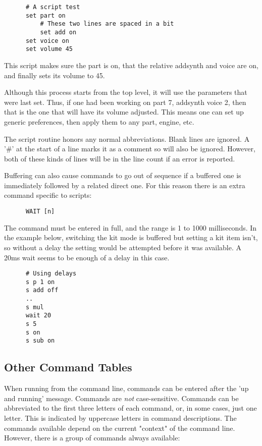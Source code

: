    \begin{verbatim}
      # A script test
      set part on
          # These two lines are spaced in a bit
          set add on
      set voice on
      set volume 45
   \end{verbatim}

   This script makes sure the part is on, that the relative addsynth and voice
   are on, and finally sets its volume to 45.

   Although this process starts from the top level, it will use the parameters
   that were last set.
   Thus, if one had been working on part 7, addsynth voice 2,
   then that is the one that will have its volume adjusted.
   This means one can set up generic preferences,
   then apply them to any part, engine, etc.

   The script routine honors any normal abbreviations.
   Blank lines are ignored. A '\#' at the start of a line marks it
   as a comment so will also be ignored. However, both of these kinds
   of lines will be in the line count if an error is reported.

   Buffering can also cause commands to go out of sequence if a buffered one is
   immediately followed by a related direct one. For this reason there is an
   extra command specific to scripts:

   \begin{verbatim}
      WAIT [n]
   \end{verbatim}

   The command must be entered in full, and the range is 1 to 1000 milliseconds.
   In the example below, switching the kit mode is buffered but setting a kit
   item isn't, so without a delay the setting would be attempted before it was
   available. A 20ms wait seems to be enough of a delay in this case.
   \begin{verbatim}
      # Using delays
      s p 1 on
      s add off
      ..
      s mul
      wait 20
      s 5
      s on
      s sub on
   \end{verbatim}

\subsection{Other Command Tables}
\label{subsec:command_line_other_command_tables}

   When running from the command line, commands can be entered after the
   'up and running' message. Commands are \textsl{not} case-sensitive.
   Commands can be abbreviated to the first three letters of each command,
   or, in some cases, just one letter.  This is indicated by
   uppercase letters in command descriptions.
   The commands available depend on the current "context" of the command line.
   However, there is a group of commands always available:

